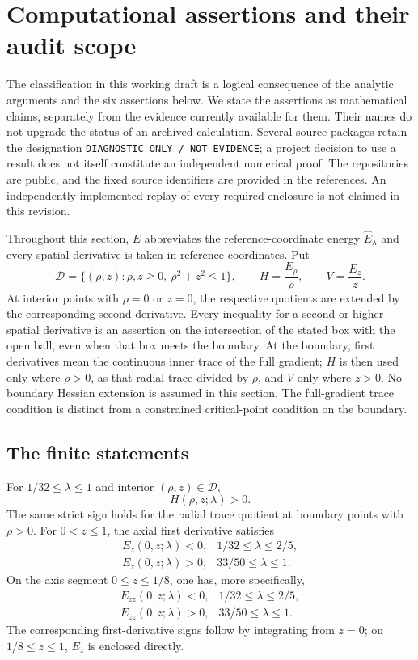 \section{Computational assertions and their audit scope}
\label{sec:computational}

The classification in this working draft is a logical consequence of the
analytic arguments and the six assertions below.  We state the assertions
as mathematical claims, separately from the evidence currently available
for them.  Their names do not upgrade the status of an archived calculation.
Several source packages retain the designation
\texttt{DIAGNOSTIC\_ONLY / NOT\_EVIDENCE}; a project decision to use a result
does not itself constitute an independent numerical proof.  The repositories
are public, and the fixed source identifiers are provided in the references.
An independently implemented replay of every required enclosure is not
claimed in this revision.

Throughout this section, $E$ abbreviates the reference-coordinate energy
$\widehat E_\lambda$ and every spatial derivative is taken in reference
coordinates.  Put
\[
 \mathcal D=\{(\rho,z):\rho,z\geq0,\ \rho^2+z^2\leq1\},\qquad
 H=\frac{E_\rho}{\rho},\qquad V=\frac{E_z}{z}.
\]
At interior points with $\rho=0$ or $z=0$, the respective quotients
are extended by the corresponding second derivative.  Every inequality
for a second or higher spatial derivative is an assertion on the
intersection of the stated box with the open ball, even when that box
meets the boundary.  At the boundary, first derivatives mean the
continuous inner trace of the full gradient; $H$ is then used only
where $\rho>0$, as that radial trace divided by $\rho$, and $V$ only
where $z>0$.  No boundary Hessian extension is assumed in this section.
The full-gradient trace condition is distinct from a constrained
critical-point condition on the boundary.

\subsection{The finite statements}

\begin{computationalassertion}
\label{comp:c1}
For $1/32\leq\lambda\leq1$ and interior $(\rho,z)\in\mathcal D$,
\[
 H(\rho,z;\lambda)>0.
\]
The same strict sign holds for the radial trace quotient at boundary
points with $\rho>0$.
For $0<z\leq1$, the axial first derivative satisfies
\[
 \begin{array}{ll}
 E_z(0,z;\lambda)<0,&1/32\leq\lambda\leq2/5,\\
 E_z(0,z;\lambda)>0,&33/50\leq\lambda\leq1.
 \end{array}
\]
On the axis segment $0\leq z\leq1/8$, one has, more specifically,
\[
 \begin{array}{ll}
 E_{zz}(0,z;\lambda)<0,&1/32\leq\lambda\leq2/5,\\
 E_{zz}(0,z;\lambda)>0,&33/50\leq\lambda\leq1.
 \end{array}
\]
The corresponding first-derivative signs follow by integrating
from $z=0$; on $1/8\leq z\leq1$, $E_z$ is enclosed directly.
\end{computationalassertion}

